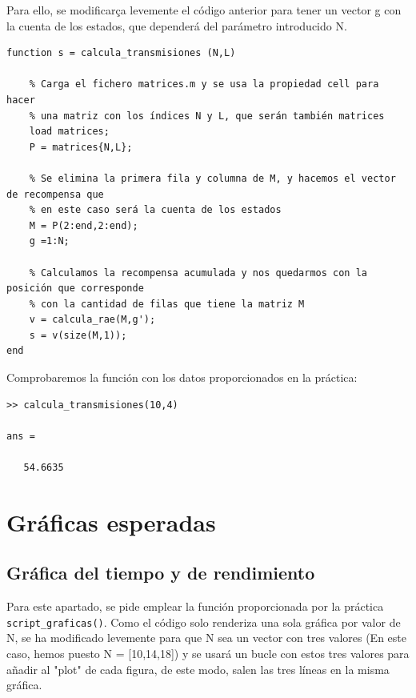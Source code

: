 \documentclass{article}
\begin{document}
Para ello, se modificarça levemente el código anterior para tener un vector g con la cuenta de los estados, que dependerá del parámetro introducido N.

\begin{verbatim}
function s = calcula_transmisiones (N,L)

    % Carga el fichero matrices.m y se usa la propiedad cell para hacer
    % una matriz con los índices N y L, que serán también matrices
    load matrices;
    P = matrices{N,L};

    % Se elimina la primera fila y columna de M, y hacemos el vector de recompensa que 
    % en este caso será la cuenta de los estados
    M = P(2:end,2:end);
    g =1:N; 

    % Calculamos la recompensa acumulada y nos quedarmos con la posición que corresponde
    % con la cantidad de filas que tiene la matriz M
    v = calcula_rae(M,g');
    s = v(size(M,1)); 
end
\end{verbatim}

Comprobaremos la función con los datos proporcionados en la práctica:

\begin{verbatim}
>> calcula_transmisiones(10,4)

ans =

   54.6635
\end{verbatim}

\section{Gráficas esperadas}

\subsection{Gráfica del tiempo y de rendimiento}

Para este apartado, se pide emplear la función proporcionada por la práctica \verb|script_graficas()|. Como el código solo renderiza una sola gráfica por valor de N, se ha modificado levemente para que N sea un vector con tres valores (En este caso, hemos puesto N = [10,14,18]) y se usará un bucle con estos tres valores para añadir al "plot" de cada figura, de este modo, salen las tres líneas en la misma gráfica.
\end{document}
